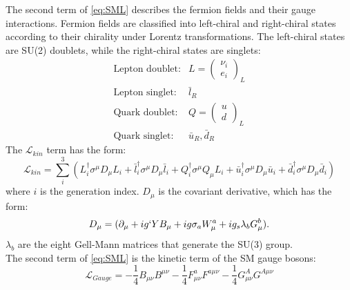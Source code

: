 \documentclass[thesis.tex]{subfiles}
\begin{document}
The second term  of \ref{eq:SML} describes the fermion fields and their gauge interactions. 
Fermion fields are classified into left-chiral and right-chiral states according to their chirality under Lorentz transformations. 
The left-chiral states are SU(2) doublets, while the right-chiral states are singlets:
	\begin{equation}
		\begin{array}{cl}
		\text{Lepton doublet}: & L = \left( \begin{array}{c} \nu_i \\ e_i \end{array} \right)_L \\
		\text{Lepton singlet}:  & \bar{l}_{R} \\
		\text{Quark doublet}:  & Q =  \left( \begin{array}{c} u \\ d \end{array} \right)_L \\
		\text{Quark singlet}:    & \bar{u}_{R}, \bar{d}_{R}
		\end{array}
		\label{eq:SML}
	\end{equation}
The $\mathcal{L}_{kin}$ term has the form: 
	\begin{equation}
		\mathcal{L}_{kin} =  \sum_{i}^3 \left( L_i^\dagger \sigma^\mu D_\mu L_i +
									\bar{l}_i^\dagger \sigma^\mu D_\mu \bar{l}_i + 
									Q_i^\dagger \sigma^\mu Q_\mu L_i +
									\bar{u}_i^\dagger \sigma^\mu D_\mu \bar{u}_i +
									\bar{d}_i^\dagger \sigma^\mu D_\mu \bar{d}_i \right)
	\end{equation}
where $i$ is the generation index. $D_\mu$ is the covariant derivative, which has the form: 
	\begin{equation}
		D_\mu = (\partial_\mu + i g`YB_\mu + i g \sigma_a W_\mu^a + ig_s \lambda_b G_\mu^{b} ).
	\end{equation}
$\lambda_b$ are the eight Gell-Mann matrices that generate the SU(3) group.  \\

The second term of \ref{eq:SML} is the kinetic term of the SM gauge bosons:
	\begin{equation} 
		\mathcal{L}_{Gauge} = -\frac{1}{4}B_{\mu\nu} B^{\mu\nu} - \frac{1}{4}F_{\mu\nu}^a F^{a \mu\nu} - \frac{1}{4} G_{\mu\nu}^A G^{A \mu\nu}
	\end{equation}
\end{document}
